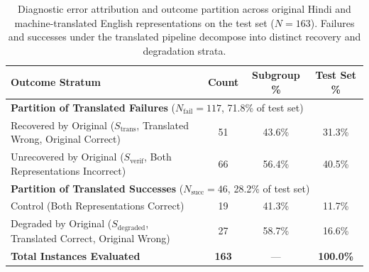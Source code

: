 \begin{table}[t]
\centering
\small
\caption{Diagnostic error attribution and outcome partition across original Hindi and machine-translated English representations on the test set ($N=163$). Failures and successes under the translated pipeline decompose into distinct recovery and degradation strata.}
\label{tab:error_attribution}
\begin{tabular}{lccc}
\toprule
\textbf{Outcome Stratum} & \textbf{Count} & \textbf{Subgroup \%} & \textbf{Test Set \%} \\
\midrule
\multicolumn{4}{l}{\textbf{Partition of Translated Failures} ($N_{\text{fail}} = 117$, 71.8\% of test set)} \\
\quad Recovered by Original ($S_{\text{trans}}$, Translated Wrong, Original Correct) & 51 & 43.6\% & 31.3\% \\
\quad Unrecovered by Original ($S_{\text{verif}}$, Both Representations Incorrect)    & 66 & 56.4\% & 40.5\% \\
\midrule
\multicolumn{4}{l}{\textbf{Partition of Translated Successes} ($N_{\text{succ}} = 46$, 28.2\% of test set)} \\
\quad Control (Both Representations Correct)                                         & 19 & 41.3\% & 11.7\% \\
\quad Degraded by Original ($S_{\text{degraded}}$, Translated Correct, Original Wrong)& 27 & 58.7\% & 16.6\% \\
\midrule
\textbf{Total Instances Evaluated} & \textbf{163} & --- & \textbf{100.0\%} \\
\bottomrule
\end{tabular}
\end{table}
